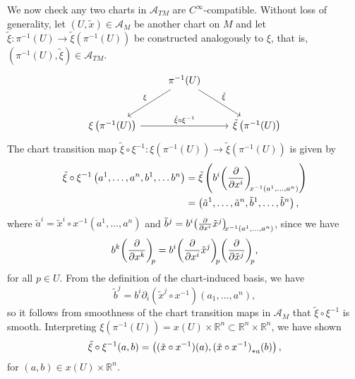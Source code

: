We now check any two charts in \(\mathscr{A}_{TM}\) are \(C^\infty\)-compatible. Without loss of generality, let \((U, \tilde{x}) \in \mathscr{A}_M\) be another chart on \(M\) and let \(\tilde{\xi} : \pi^{-1}(U) \to \tilde{\xi}\left(\pi^{-1}(U)\right)\) be constructed analogously to \(\xi\), that is, \(\left(\pi^{-1}(U), \tilde{\xi}\right) \in \mathscr{A}_{TM}.\)
\begin{equation*}
    \begin{tikzcd}[column sep = normal, row sep = large]
        & \pi^{-1}(U) \arrow[swap]{dl}{\xi} \arrow{dr}{\tilde{\xi}} &\\
        \xi\left(\pi^{-1}(U)\right) \arrow{rr}{\tilde{\xi} \circ \xi^{-1}} & & \tilde{\xi}\left(\pi^{-1}(U)\right)
    \end{tikzcd}
\end{equation*}
The chart transition map \(\tilde{\xi} \circ \xi^{-1} : \xi\left(\pi^{-1}(U)\right) \to \tilde{\xi}\left(\pi^{-1}(U)\right)\) is given by
\begin{align*}
    \tilde{\xi} \circ \xi^{-1} \left(a^1, \dots, a^n, b^1, \dots b^n\right) &= \tilde{\xi}\left(b^i \bvec{x^i}{x^{-1}\left(a^1, \dots, a^n\right)}\right)\\
                                                                      &= \left(\tilde{a}^1, \dots, \tilde{a}^n, \tilde{b}^1, \dots, \tilde{b}^n\right),
\end{align*}
where \(\tilde{a}^i = \tilde{x}^i \circ x^{-1} \left(a^1, \dots, a^n\right)\) and \(\tilde{b}^j = b^i\bvec[\tilde{x}^j]{x^i}{x^{-1}(a^1, \dots, a^n)}\), since we have
\begin{equation*}
    b^k \bvec{x^k}{p} = b^i\bvec[\tilde{x}^j]{x^i}{p} \bvec{\tilde{x}^j}{p},
\end{equation*}
for all \(p \in U\). From the definition of the chart-induced basis, we have
\begin{equation*}
    \tilde{b}^j = b^i \partial_i(\tilde{x}^j \circ x^{-1})(a_1, \dots, a^n),
\end{equation*}
so it follows from smoothness of the chart transition maps in \(\mathscr{A}_M\) that \(\tilde{\xi} \circ \xi^{-1}\) is smooth. Interpreting \(\xi(\pi^{-1}(U)) = x(U) \times \mathbb{R}^n \subset \mathbb{R}^n \times \mathbb{R}^n\), we have shown
\begin{equation*}
    \tilde{\xi}\circ \xi^{-1}(a, b) = \left((\tilde{x}\circ x^{-1})(a), \pf[a]{(\tilde{x}\circ x^{-1})}(b)\right),
\end{equation*}
for \((a, b) \in x(U) \times \mathbb{R}^n\).

